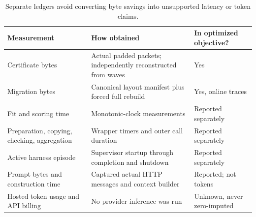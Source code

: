 \begin{table}[t]\centering\small
\caption{Separate ledgers avoid converting byte savings into unsupported latency or token claims.}\label{tab:ledgers-soundness}
\begin{tabularx}{\linewidth}{@{}p{.28\linewidth}p{.44\linewidth}X@{}}\toprule
Measurement & How obtained & In optimized objective?\\\midrule
Certificate bytes & Actual padded packets; independently reconstructed from waves & Yes\\
Migration bytes & Canonical layout manifest plus forced full rebuild & Yes, online traces\\
Fit and scoring time & Monotonic-clock measurements & Reported separately\\
Preparation, copying, checking, aggregation & Wrapper timers and outer call duration & Reported separately\\
Active harness episode & Supervisor startup through completion and shutdown & Reported separately\\
Prompt bytes and construction time & Captured actual HTTP messages and context builder & Reported; not tokens\\
Hosted token usage and API billing & No provider inference was run & Unknown, never zero-imputed\\
\bottomrule\end{tabularx}\end{table}
